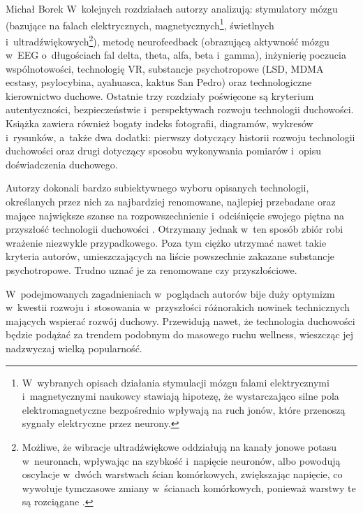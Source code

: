\begin{newrevplenv}{Michał Borek}
W~kolejnych rozdziałach autorzy analizują: stymulatory mózgu (bazujące na falach elektrycznych, magnetycznych\footnote{W~wybranych opisach działania stymulacji mózgu falami elektrycznymi i~magnetycznymi naukowcy stawiają hipotezę, że wystarczająco silne pola elektromagnetyczne bezpośrednio wpływają na ruch jonów, które przenoszą sygnały elektryczne przez neurony.}, świetlnych i~ultradźwiękowych\footnote{Możliwe, że wibracje ultradźwiękowe oddziałują na kanały jonowe potasu w~neuronach, wpływając na szybkość i~napięcie neuronów, albo powodują oscylacje w~dwóch warstwach ścian komórkowych, zwiększając napięcie, co wywołuje tymczasowe zmiany w~ścianach komórkowych, ponieważ warstwy te są rozciągane
\parencite[][s.~37]{wildman_spirit_2021}.%
}), metodę neurofeedback (obrazującą aktywność mózgu w~EEG o~długościach fal delta, theta, alfa, beta i~gamma), inżynierię poczucia wspólnotowości, technologię VR, substancje psychotropowe (LSD, MDMA ecstasy, psylocybina, ayahuasca, kaktus San Pedro) oraz technologiczne kierownictwo duchowe. Ostatnie trzy rozdziały poświęcone są kryterium autentyczności, bezpieczeństwie i~perspektywach rozwoju technologii duchowości. Książka zawiera również bogaty indeks fotografii, diagramów, wykresów i~rysunków, a~także dwa dodatki: pierwszy dotyczący historii rozwoju technologii duchowości oraz drugi dotyczący sposobu wykonywania pomiarów i~opisu doświadczenia duchowego.

Autorzy dokonali bardzo subiektywnego wyboru opisanych technologii, określanych przez nich za najbardziej renomowane, najlepiej przebadane oraz mające największe szanse na rozpowszechnienie i~odciśnięcie swojego piętna na przyszłość technologii duchowości
\parencite[][s.~250]{wildman_spirit_2021}. %
 Otrzymany jednak w~ten sposób zbiór robi wrażenie niezwykle przypadkowego. Poza tym ciężko utrzymać nawet takie kryteria autorów, umieszczających na liście powszechnie zakazane substancje psychotropowe. Trudno uznać je za renomowane czy przyszłościowe.

W~podejmowanych zagadnieniach w~poglądach autorów bije duży optymizm w~kwestii rozwoju i~stosowania w~przyszłości różnorakich nowinek technicznych mających wspierać rozwój duchowy. Przewidują nawet, że technologia duchowości będzie podążać za trendem podobnym do masowego ruchu wellness, wieszcząc jej nadzwyczaj wielką popularność.


\end{newrevplenv}
